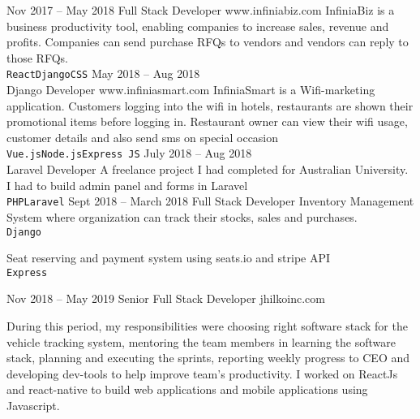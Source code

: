 \documentclass[9pt]{developercv} %
\begin{document}
\begin{entrylist}
\entry
		{Nov 2017 -- May 2018}
		{Full Stack Developer}
		{www.infiniabiz.com}
    		{
    InfiniaBiz is a business productivity tool, enabling companies to increase sales, revenue and profits. Companies can send purchase RFQs to vendors and vendors can reply to those RFQs.\\ 
    		    \texttt{React}\slashsep{}\slashsep\texttt{Django}\slashsep\texttt{CSS}\slashsep{}\slashsep{}\slashsep{}}
	\entry
		{May 2018 -- Aug 2018\\\footnotesize{}}
		{Django Developer}
		{www.infiniasmart.com}
		{
		    InfiniaSmart is a Wifi-marketing application. Customers logging into the wifi in hotels, restaurants are shown their promotional items before logging in. Restaurant owner can view their wifi usage, customer details and also send sms on special occasion\\
		    \texttt{Vue.js}\slashsep\texttt{Node.js}\slashsep\texttt{Express JS}\slashsep{}\slashsep{}\slashsep{}
		}
	\entry
		{July 2018 -- Aug 2018\\\footnotesize{}}
		{Laravel Developer}
		{}
		{
		   A freelance project I had completed for Australian University. I had to build admin panel and forms in Laravel\\ \texttt{PHP}\slashsep\texttt{Laravel}
		}
	\entry
	    {Sept 2018 -- March 2018}
	    {Full Stack Developer}
	    {}
	    {
	        Inventory Management System where organization can track their stocks, sales and purchases.\\
	        \texttt{Django}\slashsep{}\slashsep{}\slashsep{}\slashsep{}
	    }
	    
	    {Seat reserving and payment system using seats.io and stripe API\\
	        \texttt{Express}\slashsep{}\slashsep{}\slashsep{}
	    }
	    
	  \entry
		 {Nov 2018 -- May 2019}
		{Senior Full Stack Developer}
		{jhilkoinc.com}
		{
		During this period, my responsibilities were choosing right software stack for the vehicle tracking system, mentoring the team members in learning the software stack, planning and executing the sprints, reporting weekly progress to CEO and developing dev-tools to help improve team’s productivity. I worked on ReactJs and react-native to build web applications and mobile applications using Javascript.

}
\end{entrylist}
\end{document}
